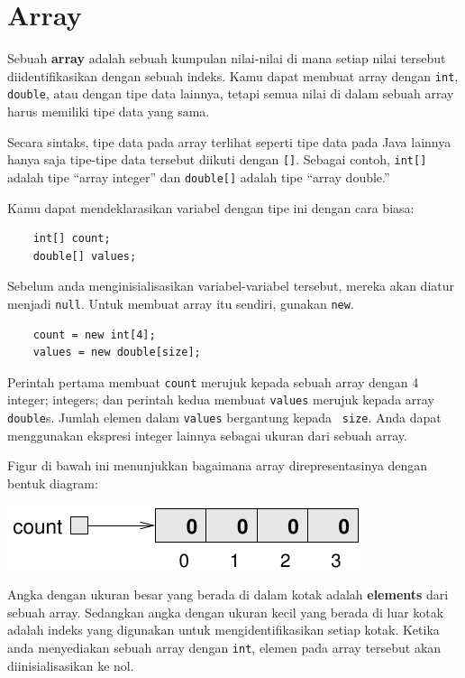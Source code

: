 \chapter{Array}

Sebuah {\bf array}
adalah sebuah kumpulan nilai-nilai di mana setiap nilai tersebut diidentifikasikan dengan sebuah indeks.
Kamu dapat membuat array dengan
{\tt int}, {\tt double}, atau dengan tipe data lainnya, 
tetapi semua nilai di dalam sebuah array harus memiliki tipe data yang sama.

Secara sintaks, tipe data pada array terlihat seperti tipe data pada Java lainnya hanya saja tipe-tipe data tersebut 
diikuti dengan {\tt []}.  Sebagai contoh, {\tt int[]} adalah tipe ``array
integer'' dan {\tt double[]} adalah tipe ``array double.''

Kamu dapat mendeklarasikan variabel dengan tipe ini dengan cara biasa:

\begin{lstlisting}
    int[] count;
    double[] values;
\end{lstlisting}
%
Sebelum anda menginisialisasikan variabel-variabel tersebut, mereka akan diatur menjadi {\tt null}.
Untuk membuat array itu sendiri, gunakan {\tt new}.

\begin{lstlisting}
    count = new int[4];
    values = new double[size];
\end{lstlisting}
%
Perintah pertama membuat {\tt count} merujuk kepada sebuah array dengan 4 integer;
integers; dan perintah kedua membuat {\tt values} merujuk kepada array {\tt
double}s.  Jumlah elemen dalam {\tt values} bergantung kepada {\tt
size}.  Anda dapat menggunakan ekspresi integer lainnya sebagai ukuran dari sebuah array.


Figur di bawah ini menunjukkan bagaimana array direpresentasinya dengan bentuk diagram:


\includegraphics{array.pdf}


Angka dengan ukuran besar yang berada di dalam kotak adalah {\bf elements} dari sebuah array.  Sedangkan angka dengan ukuran kecil yang berada di luar kotak adalah indeks yang digunakan untuk mengidentifikasikan setiap kotak.  Ketika anda menyediakan sebuah array dengan
 {\tt int}, elemen pada array tersebut akan diinisialisasikan ke nol.


